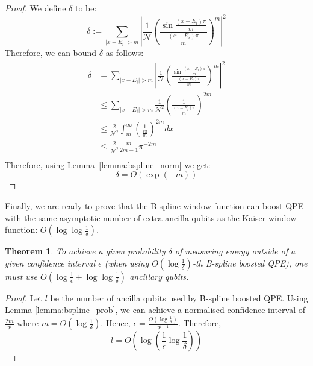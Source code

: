 \documentclass[a4paper,twocolumn,,accepted=2025-05-27]{quantumarticle}
\theoremstyle{empty}
\newtheorem{duplicate}{Theorem}
\begin{document}
\begin{proof}
We define $\delta$ to be:
\begin{equation}
     \delta := \sum_{|x - E_i| > m} \left| \frac{1}{\mathcal{N}}\left(\frac{\sin \frac{(x-E_i)\pi}{m}}{ \frac{(x-E_i)\pi}{m}}\right)^m \right|^2
\end{equation}
Therefore, we can bound $\delta$ as follows:
    \begin{align}
        \delta &= \sum_{|x - E_i| > m} \left|\frac{1}{\mathcal{N}}\left(\frac{\sin \frac{(x-E_i)\pi}{m}}{ \frac{(x-E_i)\pi}{m}}\right)^m \right|^2 \\
        &\leq \sum_{|x - E_i| > m} \frac{1}{\mathcal{N}^2}\left(\frac{1}{ \frac{(x-E_i)\pi}{m}}\right)^{2m} \\
        &\leq \frac{2}{\mathcal{N}^2}\int_{m}^{\infty} \left(\frac{1}{ \frac{x\pi}{m}}\right)^{2m} dx\\
        & \leq  \frac{2}{\mathcal{N}^2} \frac{m}{2m-1}\pi^{-2m}\\
    \end{align}
    Therefore, using Lemma~\ref{lemma:bspline_norm} we get:
    \begin{equation}
        \delta = O(\exp(-m))
    \end{equation}
\end{proof}
Finally, we are ready to prove that the B-spline window function can boost QPE with the same asymptotic number of extra ancilla qubits as the Kaiser window function: $O\left(\log \log \frac{1}{\delta}\right)$.
\begin{duplicate}
To achieve a given probability $\delta$ of measuring energy outside of a given confidence interval $\epsilon$ (when using $O(\log \frac{1}{\delta})$-th B-spline boosted QPE), one must use $O(\log \frac{1}{\epsilon} + \log \log \frac{1}{\delta})$ ancillary qubits.
\end{duplicate}
\begin{proof}
Let $l$ be the number of ancilla qubits used by B-spline boosted QPE. Using Lemma \ref{lemma:bspline_prob}, we can achieve a normalised confidence interval of $\frac{2m}{2^l}$ where $m = O(\log \frac{1}{\delta})$. Hence, $\epsilon = \frac{O(\log \frac{1}{\delta})}{2^{l-1}}$. Therefore,
\begin{equation*}
    l = O\left(\log \left(\frac{1}{\epsilon}\log \frac{1}{\delta}\right)\right)
\end{equation*}
\end{proof}
\end{document}
